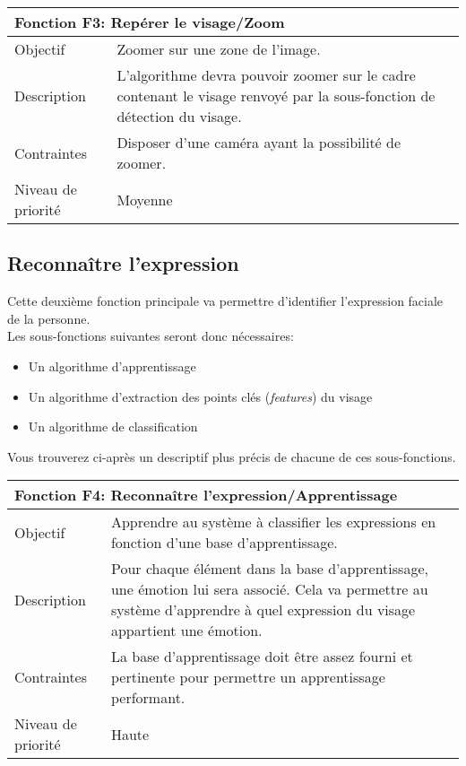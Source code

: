 \documentclass[overfullbox, poster]{polytech/polytech}
\begin{document}
\begin{tabular}{|l|p{12.5cm}|}
   \hline
   \multicolumn{2}{|l|}{\textbf{Fonction F3: Repérer le visage/Zoom}} \\
   \hline
   Objectif &Zoomer sur une zone de l'image. \\
   \hline
   Description &L'algorithme devra pouvoir zoomer sur le cadre contenant le visage renvoyé par la sous-fonction de détection du visage. \\
   \hline
   Contraintes &Disposer d'une caméra ayant la possibilité de zoomer. \\
   \hline
   Niveau de priorité &Moyenne \\
   \hline
\end{tabular}

\subsection{Reconnaître l'expression}
Cette deuxième fonction principale va permettre d'identifier l'expression faciale de la personne.\\
Les sous-fonctions suivantes seront donc nécessaires:
\begin{itemize}
\item Un algorithme d'apprentissage
\item Un algorithme d'extraction des points clés (\textit{features}) du visage
\item Un algorithme de classification\\
\end{itemize}

Vous trouverez ci-après un descriptif plus précis de chacune de ces sous-fonctions.

\begin{tabular}{|l|p{12.5cm}|}
   \hline
   \multicolumn{2}{|l|}{\textbf{Fonction F4: Reconnaître l'expression/Apprentissage}} \\
   \hline
   Objectif &Apprendre au système à classifier les expressions en fonction d'une base d'apprentissage.\\
   \hline
   Description &Pour chaque élément dans la base d'apprentissage, une émotion lui sera associé. Cela va permettre au système d'apprendre à quel expression du visage appartient une émotion.\\
   \hline
   Contraintes &La base d'apprentissage doit être assez fourni et pertinente pour permettre un apprentissage performant. \\
   \hline
   Niveau de priorité &Haute \\
   \hline
\end{tabular}
\end{document}

